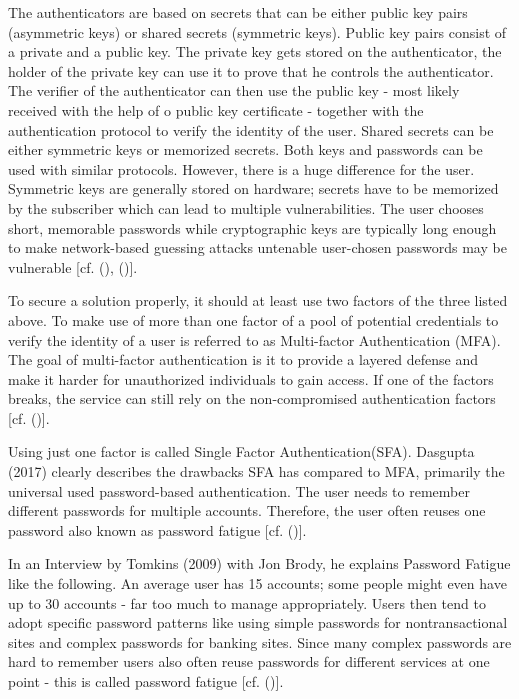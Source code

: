 The authenticators are based on secrets that can be either public key pairs (asymmetric keys) or shared secrets (symmetric keys). Public key pairs consist of a private and a public key. The private key gets stored on the authenticator, the holder of the private key can use it to prove that he controls the authenticator. The verifier of the authenticator can then use the public key - most likely received with the help of o public key certificate - together with the authentication protocol to verify the identity of the user. Shared secrets can be either symmetric keys or memorized secrets. Both keys and passwords can be used with similar protocols. However, there is a huge difference for the user. Symmetric keys are generally stored on hardware; secrets have to be memorized by the subscriber which can lead to multiple vulnerabilities. The user chooses short, memorable passwords while cryptographic keys are typically long enough to make network-based guessing attacks untenable user-chosen passwords may be vulnerable [cf. (\cite{NIST:2017:DIG}), (\cite{Dasgupta:2017:AUA})]. 


To secure a solution properly, it should at least use two factors of the three listed above. To make use of more than one factor of a pool of potential credentials to verify the identity of a user is referred to as Multi-factor Authentication (MFA). The goal of multi-factor authentication is it to provide a layered defense and make it harder for unauthorized individuals to gain access. If one of the factors breaks, the service can still rely on the non-compromised authentication factors [cf. (\cite{Dasgupta:2017:AUA})].

Using just one factor is called Single Factor Authentication(SFA). Dasgupta (2017) clearly describes the drawbacks SFA has compared to MFA, primarily the universal used password-based authentication. The user needs to remember different passwords for multiple accounts. Therefore, the user often reuses one password also known as password fatigue [cf. (\cite{Dasgupta:2017:AUA})].

In an Interview by Tomkins (2009) with Jon Brody, he explains Password Fatigue like the following. An average user has 15 accounts; some people might even have up to 30 accounts - far too much to manage appropriately. Users then tend to adopt specific password patterns like using simple passwords for nontransactional sites and complex passwords for banking sites. Since many complex passwords are hard to remember users also often reuse passwords for different services at one point - this is called password fatigue [cf. (\cite{Tomkins:2009:DPF})]. 

